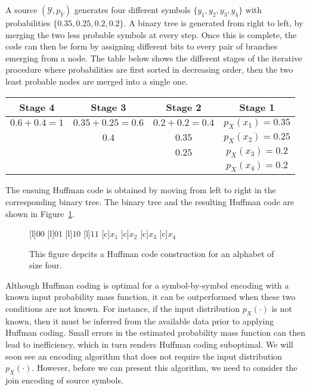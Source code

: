 \begin{example}
A source $(\mathcal{Y}, p_Y)$ generates four different symbols $\{ y_1, y_2, y_3, y_4 \}$ with probabilities $\{ 0.35, 0.25, 0.2, 0.2 \}$.
A binary tree is generated from right to left, by merging the two less probable symbols at every step.
Once this is complete, the code can then be form by assigning different bits to every pair of branches emerging from a node.
The table below shows the different stages of the iterative procedure where probabilities are first sorted in decreasing order, then the two least probable nodes are merged into a single one.

\begin{center}
\begin{tabular}{|c|c|c|c|}
\hline
Stage 4 & Stage 3 & Stage 2 & Stage 1 \\
\hline
$0.6 + 0.4 = 1$ & $0.35 + 0.25 = 0.6$ & $0.2 + 0.2 = 0.4$ & $p_X (x_1) = 0.35$ \\
& $0.4$ & $0.35$ & $p_X (x_2) = 0.25$ \\
& & $0.25$ & $p_X (x_3) = 0.2$ \\
& & & $p_X (x_4) = 0.2$ \\
\hline
\end{tabular}
\end{center}

The ensuing Huffman code is obtained by moving from left to right in the corresponding binary tree.
The binary tree and the resulting Huffman code are shown in Figure~\ref{figure:Huffman2}.

\begin{figure}[htbp]
\begin{center}
\begin{psfrags}
[l]{$00$}
[l]{$01$}
[l]{$10$}
[l]{$11$}
[c]{$x_1$}
[c]{$x_2$}
[c]{$x_3$}
[c]{$x_4$}
\end{psfrags}
\caption{This figure depcits a Huffman code construction for an alphabet of size four.}
\label{figure:Huffman2}
\end{center}
\end{figure}

\end{example}

Although Huffman coding is optimal for a symbol-by-symbol encoding with a known input probability mass function, it can be outperformed when these two conditions are not known.
For instance, if the input distribution $p_X(\cdot)$ is not known, then it must be inferred from the available data prior to applying Huffman coding.
Small errors in the estimated probability mass function can then lead to inefficiency, which in turn renders Huffman coding suboptimal.
We will soon see an encoding algorithm that does not require the input distribution $p_X(\cdot)$.
However, before we can present this algorithm, we need to consider the join encoding of source symbols.


